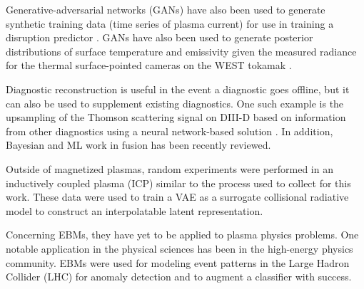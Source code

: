 Generative-adversarial networks (GANs) \cite{goodfellow_generative_2014} have also been used to generate synthetic training data (time series of plasma current) for use in training a disruption predictor \cite{dave_synthetic_2023}. GANs have also been used to generate posterior distributions of surface temperature and emissivity given the measured radiance for the thermal surface-pointed cameras on the WEST tokamak \cite{juven_generative_2024}. 

Diagnostic reconstruction is useful in the event a diagnostic goes offline, but it can also be used to supplement existing diagnostics.  One such example is the upsampling of the Thomson scattering signal on DIII-D based on information from other diagnostics using a neural network-based solution \cite{jalalvand_multimodal_2024}. In addition, Bayesian and ML work in fusion has been recently reviewed\cite{pavone_machine_2023}.

Outside of magnetized plasmas, random experiments were performed in an inductively coupled plasma (ICP) similar to the process used to collect for this work. These data were used to train a VAE as a surrogate collisional radiative model \cite{daly_data-driven_2023} to construct an interpolatable latent representation.

Concerning EBMs, they have yet to be applied to plasma physics problems. One notable application in the physical sciences has been in the high-energy physics community. EBMs were used for modeling event patterns in the Large Hadron Collider (LHC) for anomaly detection and to augment a classifier \cite{cheng_versatile_2024} with success.




